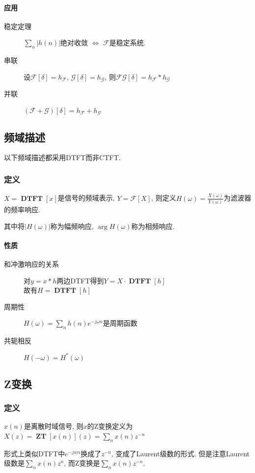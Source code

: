 \documentclass{ctexart}
\DeclareMathOperator{\DTFT}{\mathbf{DTFT}}
\DeclareMathOperator{\ZT}{\mathbf{ZT}}
\begin{document}
\paragraph{应用} \begin{description}
        \item[稳定定理] $\sum_n |h(n)|$绝对收敛 $\Leftrightarrow$ $\mathcal{F}$是稳定系统.
        \item[串联] 设$\mathcal{F}[\delta] = h_{\mathcal{F}},\,\mathcal{G}[\delta] = h_{\mathcal{G}}$, 
            则$\mathcal{F} \mathcal{G} [\delta] = h_{\mathcal{F}} * h_{\mathcal{G}}$
        \item[并联] $\left(\mathcal{F} + \mathcal{G}\right) [\delta] = h_{\mathcal{F}} + h_{\mathcal{G}}$
    \end{description}

\subsection{频域描述}
    以下频域描述都采用DTFT而非CTFT.
\subsubsection{定义} $X = \DTFT[x]$是信号的频域表示, $Y = \mathcal{F}[X]$,
    则定义$H(\omega) = \frac{X(\omega)}{Y(\omega)}$为滤波器的频率响应.\par
    其中将$|H(\omega)|$称为幅频响应, $\arg H(\omega)$称为相频响应.
\paragraph{性质} \begin{description}
    \item[和冲激响应的关系] 对$y = x * h$两边DTFT得到$Y = X \cdot \DTFT[h]$\\ 故有$H = \DTFT[h]$
    \item[周期性] $H(\omega) = \sum_n h(n) e^{-j\omega n}$是周期函数
    \item[共轭相反] $H(-\omega) = H^*(\omega)$
\end{description}

\subsection{Z变换}
\subsubsection{定义} $x(n)$是离散时域信号,
    则$x$的Z变换定义为$X(z) = \ZT[x(n)](z) = \sum_n x(n) z^{-n}$\par
    形式上类似DTFT中$e^{-jwn}$换成了$z^{-n}$, 变成了Laurent级数的形式.
    但是注意Laurent级数是$\sum_n x (n) z^n$, 而Z变换是$\sum_n x (n) z^{-n}$.
\end{document}
